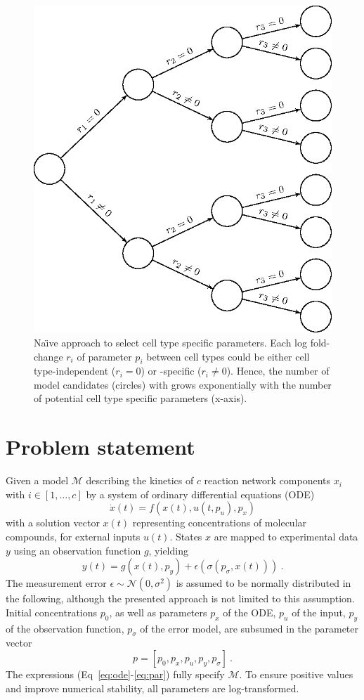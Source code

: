 \documentclass{bioinfo}
\begin{document}
\begin{figure}[!tpb]%
\centerline{\includegraphics[width=.4\textwidth]{Figures/tree.eps}}
\caption{Na\"{\i}ve approach to select cell type specific parameters. Each log fold-change $r_i$ of parameter $p_i$ between cell types could be either cell type-independent ($r_i=0$) or -specific ($r_i\neq 0$). Hence, the number of model candidates (circles) with grows exponentially with the number of potential cell type specific parameters (x-axis).}\label{fig:01}
\end{figure}

\section{Problem statement}

Given a model $\mathcal M$ describing the kinetics of $c$ reaction network components $x_i$ with $i \in [1,\dots,c]$ by a system of ordinary differential equations (ODE)
\begin{equation}
\dot x(t) = f(x(t),u(t,p_u),p_x)\label{eq:ode}
\end{equation}
with a solution vector $x(t)$ representing concentrations of molecular compounds, for external inputs $u(t)$.
States $x$ are mapped to experimental data $y$ using an observation function $g$, yielding
\begin{equation}
y(t) = g(x(t),p_y)+\epsilon(\sigma(p_\sigma,x(t))) \:.\label{eq:obs}
\end{equation}
The measurement error $\epsilon \sim \mathcal N(0,\sigma^2)$ is assumed to be normally distributed in the following, although the presented approach is not limited to this assumption.
Initial concentrations $p_0$, as well as parameters $p_x$ of the ODE, $p_u$ of the input, $p_y$ of the observation function, $p_\sigma$ of the error model, are subsumed in the parameter vector
\begin{equation}
p = [p_0, p_x, p_u, p_y, p_\sigma] \:.\label{eq:par}
\end{equation}
The expressions (Eq~\ref{eq:ode}-\ref{eq:par}) fully specify $\mathcal M$.
To ensure positive values and improve numerical stability, all parameters are log-transformed.
\end{document}

